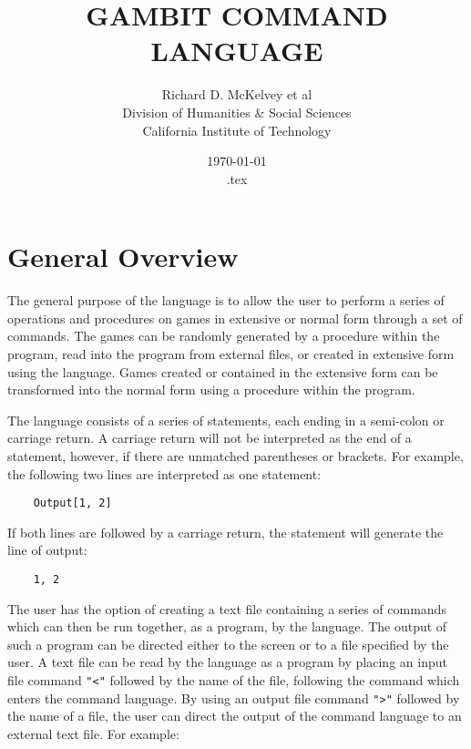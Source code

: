 \renewcommand{\baselinestretch}{.9}
\newcommand{\bd}{\begin{description}}
\newcommand{\ed}{\end{description}}


\title{GAMBIT COMMAND LANGUAGE}

\author{Richard D. McKelvey et al\\
Division of Humanities \& Social Sciences\\
California Institute of Technology}

\date{\today\\ \time \jobname.tex}

\maketitle

\section*{General Overview}

The general purpose of the language is to allow the user to perform a series of
operations and procedures on games in extensive or normal form through a set of
commands.  The games can be randomly generated by a procedure within the
program, read into the program from external files, or created in extensive
form using the language.  Games created or contained in the extensive form can
be transformed into the normal form using a procedure within the program.

The language consists of a series of statements, each ending in a semi-colon
or carriage return.  A carriage return will not be interpreted as the end of a
statement, however, if there are unmatched parentheses or brackets.  For
example, the following two lines are interpreted as one statement:

\begin{verbatim}
	Output[1, 2]
\end{verbatim}

If both lines are followed by a carriage return, the statement will generate
the line of output: 

\begin{verbatim}
	1, 2
\end{verbatim}

The user has the option of creating a text file containing a series of commands
which can then be run together, as a program, by the language.  The output of 
such a program can be directed either to the screen or to a file specified by 
the user.  A text file can be read by the language as a program by placing an 
input file command {\tt "<"} followed by the name of the file, following the 
command which enters the command language.  By using an output file command 
{\tt ">"} followed by the name of a file, the user can direct the output of 
the command language to an external text file.  For example:

